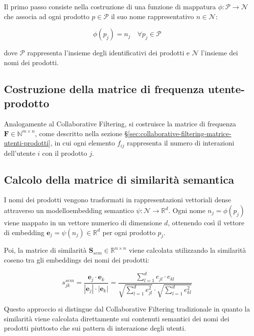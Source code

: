 Il primo passo consiste nella costruzione di una funzione di mappatura $\phi: \mathcal{P} \rightarrow \mathcal{N}$ che associa ad ogni prodotto $p \in \mathcal{P}$ il suo nome rappresentativo $n \in \mathcal{N}$:

\begin{equation}
\phi(p_j) = n_j \quad \forall p_j \in \mathcal{P}
\end{equation}

dove $\mathcal{P}$ rappresenta l'insieme degli identificativi dei prodotti e $\mathcal{N}$ l'insieme dei nomi dei prodotti.

\subsection{Costruzione della matrice di frequenza utente-prodotto}

Analogamente al Collaborative Filtering, si costruisce la matrice di frequenza $\mathbf{F} \in \mathbb{N}^{m \times n}$, come descritto nella sezione \S\ref{sec:collaborative-filtering-matrice-utenti-prodotti}, in cui ogni elemento $f_{ij}$ rappresenta il numero di interazioni dell'utente $i$ con il prodotto $j$.

\subsection{Calcolo della matrice di similarità semantica}

I nomi dei prodotti vengono trasformati in rappresentazioni vettoriali dense attraverso un \gls{modelloembedding} semantico $\psi: \mathcal{N} \rightarrow \mathbb{R}^d$. Ogni nome $n_j = \phi(p_j)$ viene mappato in un vettore numerico di dimensione $d$, ottenendo così il vettore di embedding $\mathbf{e}_j = \psi(n_j) \in \mathbb{R}^d$ per ogni prodotto $p_j$.

Poi, la matrice di similarità $\mathbf{S}_{sem} \in \mathbb{R}^{n \times n}$ viene calcolata utilizzando la similarità coseno tra gli embeddings dei nomi dei prodotti:

\begin{equation}
s_{jk}^{sem} = \frac{\mathbf{e}_j \cdot \mathbf{e}_k}{|\mathbf{e}_j| \cdot |\mathbf{e}_k|} = \frac{\sum_{l=1}^{d} e_{jl} \cdot e_{kl}}{\sqrt{\sum_{l=1}^{d} e_{jl}^2} \cdot \sqrt{\sum_{l=1}^{d} e_{kl}^2}}
\end{equation}

Questo approccio si distingue dal Collaborative Filtering tradizionale in quanto la similarità viene calcolata direttamente sui contenuti semantici dei nomi dei prodotti piuttosto che sui pattern di interazione degli utenti.

